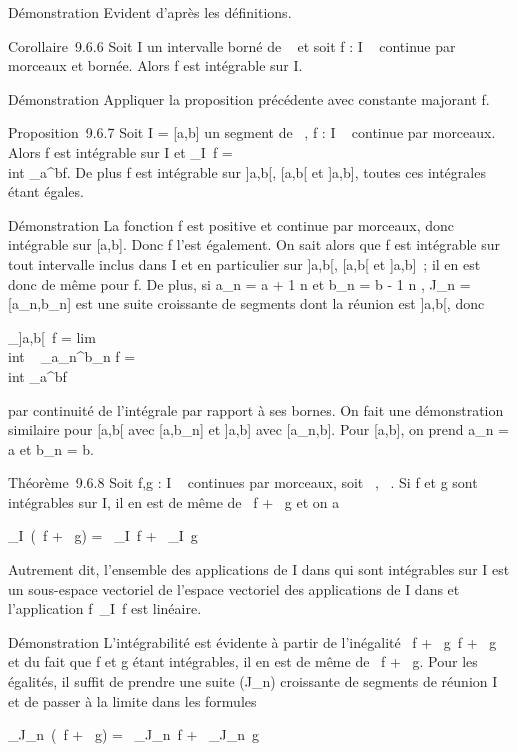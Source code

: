 \documentclass[]{article}
\begin{document}
Démonstration Evident d'après les définitions.

Corollaire~9.6.6 Soit I un intervalle borné de ~ et soit f : I \rightarrow~ 
continue par morceaux et bornée. Alors f est intégrable sur I.

Démonstration Appliquer la proposition précédente avec \phi constante
majorant f.

Proposition~9.6.7 Soit I = [a,b] un segment de ~, f : I \rightarrow~  continue
par morceaux. Alors f est intégrable sur I et
\int  _I~f =\\int
 _a^bf. De plus f est intégrable sur ]a,b[,
[a,b[ et ]a,b], toutes ces intégrales étant égales.

Démonstration La fonction f est positive et continue
par morceaux, donc intégrable sur [a,b]. Donc f l'est également. On
sait alors que f est intégrable sur tout intervalle
inclus dans I et en particulier sur ]a,b[, [a,b[ et ]a,b]~;
il en est donc de même pour f. De plus, si a_n = a + 1
\over n et b_n = b - 1 \over
n , J_n = [a_n,b_n] est une suite
croissante de segments dont la réunion est ]a,b[, donc

\int  _]a,b[~f
= lim\\int ~
_a_n^b_n f =\\int
 _a^bf

par continuité de l'intégrale par rapport à ses bornes. On fait une
démonstration similaire pour [a,b[ avec [a,b_n] et
]a,b] avec [a_n,b]. Pour [a,b], on prend
a_n = a et b_n = b.

Théorème~9.6.8 Soit f,g : I \rightarrow~  continues par morceaux, soit \alpha~,\beta~ \in {}. Si
f et g sont intégrables sur I, il en est de même de \alpha~f + \beta~g et on a

\int  _I~(\alpha~f + \beta~g) =
\alpha~\int  _I~f +
\beta~\int  _I~g

Autrement dit, l'ensemble des applications de I dans  qui sont
intégrables sur I est un sous-espace vectoriel de l'espace vectoriel des
applications de I dans  et l'application
f\mapsto~\int  _I~f
est linéaire.

Démonstration L'intégrabilité est évidente à partir de l'inégalité
\alpha~f + \beta~g\leq\alpha~f +
\beta~g et du fait que
f et g étant intégrables, il en
est de même de \alpha~f +
\beta~g. Pour les égalités, il suffit
de prendre une suite (J_n) croissante de segments de réunion I
et de passer à la limite dans les formules

\int  _J_n~(\alpha~f + \beta~g) =
\alpha~\int  _J_n~f +
\beta~\int  _J_n~g
\end{document}
